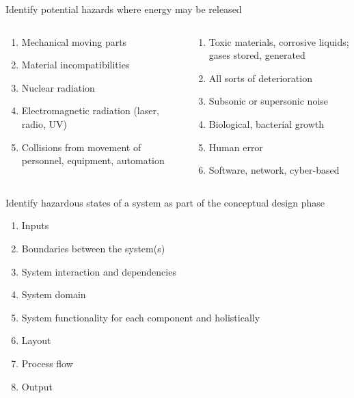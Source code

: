\documentclass[aspectratio=1610,pdftex,dvipsnames,compress,xcolor={dvipsnames}]{beamer}
\begin{document}
\addtocounter{framenumber}{-1}
\begin{frame}{Identify potential hazards where energy may be released}
    \begin{columns}[c]

        \begin{column}{0.50\textwidth}
            \begin{enumerate}[series=outerlist,topsep=0pt,itemsep=11pt,leftmargin=*,label=(\arabic*)]
                \item[]Mechanical moving parts  
                \item[]Material incompatibilities  
                \item[]Nuclear radiation  
                \item[]Electromagnetic radiation (laser, radio, UV)  
                \item[]Collisions from movement of personnel, equipment, automation
            \end{enumerate}
        \end{column}

        \begin{column}{0.50\textwidth}
            \begin{enumerate}[series=outerlist,topsep=0pt,itemsep=11pt,leftmargin=*,label=(\arabic*)]
                \item[]Toxic materials, corrosive liquids; gases stored, generated  
                \item[]All sorts of deterioration  
                \item[]Subsonic or supersonic noise  
                \item[]Biological, bacterial growth  
                \item[]Human error  
                \item[]Software, network, cyber-based 
            \end{enumerate}
        \end{column}

    \end{columns}
\end{frame}


\begin{frame}{Identify hazardous states of a system as part of the conceptual design phase}
    \begin{enumerate}[series=outerlist,topsep=0pt,itemsep=7pt,leftmargin=*,label=(\arabic*)]
        \item[]Inputs
        \item[]Boundaries between the system(s)  
        \item[]System interaction and dependencies  
        \item[]System domain  
        \item[]System functionality for each component and holistically  
        \item[]Layout  
        \item[]Process flow  
        \item[]Output
    \end{enumerate}
\end{frame}
\end{document}
